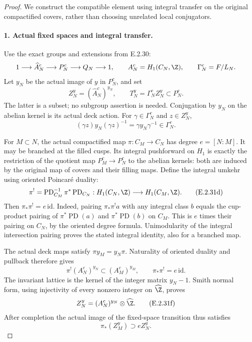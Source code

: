 \begin{proof}
We construct the compatible element using integral transfer
on the original compactified covers, rather than choosing
unrelated local conjugators.

\paragraph{1. Actual fixed spaces and integral transfer.}
Use the exact groups and extensions from E.2.30:
\[
 1\longrightarrow\widehat A_N^c\longrightarrow P_N^c
   \longrightarrow Q_N\longrightarrow1,
 \qquad A_N^c=H_1(C_N,\Z),\qquad\Gamma_N^c=F/L_N.
\]
Let \(y_N\) be the actual image of \(y\) in \(P_N^c\), and set
\[
 Z_N^y=(\widehat A_N^c)^{y_N},\qquad
 T_N^y=\Gamma_N^c Z_N^y\subset P_N^c.
\tag{E.2.31b}
\]
The latter is a subset; no subgroup assertion is needed.
Conjugation by \(y_N\) on the abelian kernel is its actual
deck action. For \(\gamma\in\Gamma_N^c\) and \(z\in Z_N^y\),
\[
 (\gamma z)y_N(\gamma z)^{-1}
      =\gamma y_N\gamma^{-1}\in\Gamma_N^c.
\tag{E.2.31c}
\]

For \(M\subset N\), the actual compactified map
\(\pi:C_M\to C_N\) has degree \(e=[N:M]\). It may be
branched at the filled cusps. Its integral pushforward on
\(H_1\) is exactly the restriction of the quotient map
\(P_M^c\to P_N^c\) to the abelian kernels: both are induced
by the original map of covers and their filling maps.
Define the integral umkehr using oriented Poincar\'{e} duality:
\[
 \pi^!=\operatorname{PD}_{C_M}^{-1}\pi^*
              \operatorname{PD}_{C_N}:
 H_1(C_N,\Z)\longrightarrow H_1(C_M,\Z).
\tag{E.2.31d}
\]
Then \(\pi_*\pi^!=e\,\mathrm{id}\). Indeed, pairing
\(\pi_*\pi^!a\) with any integral class \(b\) equals the
cup-product pairing of \(\pi^*\operatorname{PD}(a)\) and
\(\pi^*\operatorname{PD}(b)\) on \(C_M\). This is \(e\)
times their pairing on \(C_N\), by the oriented degree
formula. Unimodularity of the integral intersection pairing
proves the stated integral identity, also for a branched map.

The actual deck maps satisfy \(\pi y_M=y_N\pi\).
Naturality of oriented duality and pullback therefore gives
\[
 \pi^!(A_N^c)^{y_N}\subset(A_M^c)^{y_M},
 \qquad\pi_*\pi^!=e\,\mathrm{id}.
\tag{E.2.31e}
\]
The invariant lattice is the kernel of the integer matrix
\(y_N-1\). Smith normal form, using injectivity of every
nonzero integer on \(\widehat\Z\), proves
\[
 Z_N^y=(A_N^c)^{y_N}\otimes\widehat\Z.
\tag{E.2.31f}
\]
After completion the actual image of the fixed-space
transition thus satisfies
\[
 \pi_*(Z_M^y)\supset eZ_N^y.
\tag{E.2.31g}
\]


\end{proof}

